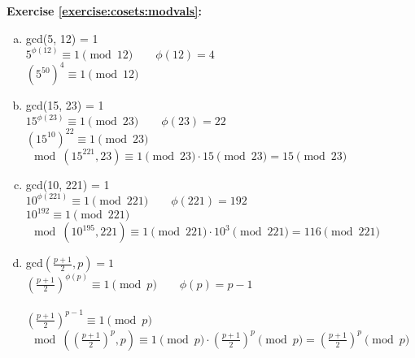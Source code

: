 \noindent\textbf{Exercise \ref{exercise:cosets:modvals}:}
\begin{enumerate}[(a)]
\item
gcd(5, 12) = 1
\\
$5^{\phi(12)} \equiv 1 \pmod{12} \quad \quad \phi(12) = 4$
\\
$(5^{50})^4 \equiv 1 \pmod{12}$


\item
gcd(15, 23) = 1
\\
$15^{\phi(23)} \equiv 1 \pmod{23} \quad \quad \phi(23) = 22$
\\
$(15^{10})^{22} \equiv 1 \pmod{23}$
\\
$\mod(15^{221}, 23) \equiv 1 \pmod{23} \cdot 15 \pmod{23} = 15 \pmod{23}$



\item
gcd(10, 221) = 1
\\
$10^{\phi(221)} \equiv 1 \pmod{221} \quad \quad \phi(221) = 192$
\\
$10^{192} \equiv 1 \pmod{221}$
\\
$\mod(10^{195},221) \equiv 1 \pmod{221} \cdot 10^3 \pmod{221} = 116 \pmod{221}$

\item
gcd$(\frac{p+1}{2}, p) = 1$
\\
$\left(\frac{p+1}{2}\right)^{\phi(p)} \equiv 1 \pmod{p} \quad \quad \phi(p) = p - 1$
\\
\\
$\left(\frac{p+1}{2}\right)^{p-1} \equiv 1 \pmod{p}$
\\
$\mod \left( \left( \frac{p+1}{2} \right)^p,p\right) \equiv 1 \pmod{p} \cdot \left( \frac{p+1}{2} \right)^p \pmod{p} =  \left( \frac{p+1}{2} \right)^p \pmod{p}$
\end{enumerate}

